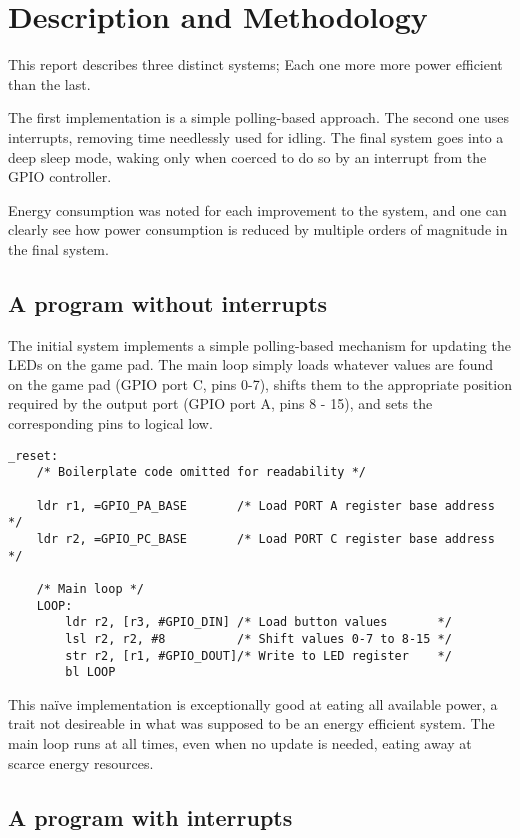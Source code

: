 \section{Description and Methodology}

This report describes three distinct systems; Each one more more power efficient than the last.

The first implementation is a simple polling-based approach. The second one uses interrupts, removing time needlessly used for idling. The final system goes into a deep sleep mode, waking only when coerced to do so by an interrupt from the GPIO controller.

Energy consumption was noted for each improvement to the system, and one can clearly see how power consumption is reduced by multiple orders of magnitude in the final system.

\subsection{A program without interrupts}

The initial system implements a simple polling-based mechanism for updating the LEDs on the game pad. The main loop simply loads whatever values are found on the game pad (GPIO port C, pins 0-7), shifts them to the appropriate position required by the output port (GPIO port A, pins 8 - 15), and sets the corresponding pins to logical low.

\begin{lstlisting}[caption={Polling loop}, label={lst:polling-loop}]
_reset:
    /* Boilerplate code omitted for readability */

    ldr r1, =GPIO_PA_BASE       /* Load PORT A register base address    */
    ldr r2, =GPIO_PC_BASE       /* Load PORT C register base address    */

    /* Main loop */
    LOOP:
        ldr r2, [r3, #GPIO_DIN] /* Load button values       */
        lsl r2, r2, #8          /* Shift values 0-7 to 8-15 */
        str r2, [r1, #GPIO_DOUT]/* Write to LED register    */
        bl LOOP

\end{lstlisting}

This naïve implementation is exceptionally good at eating all available power, a trait not desireable in what was supposed to be an energy efficient system. The main loop runs at all times, even when no update is needed, eating away at scarce energy resources.


\subsection{A program with interrupts}

